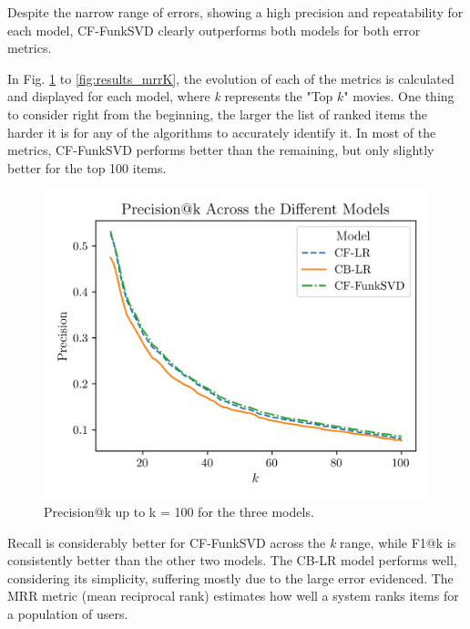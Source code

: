 \documentclass[conference]{IEEEtran}
\begin{document}
Despite the narrow range of errors, showing a high precision and repeatability for each model, CF-FunkSVD clearly outperforms both models for both error metrics.

In Fig. \ref{fig:results_precisionK} to \ref{fig:results_mrrK}, the evolution of each of the metrics is calculated and displayed for each model, where \textit{k} represents the "Top $k$" movies. One thing to consider right from the beginning, the larger the list of ranked items the harder it is for any of the algorithms to accurately identify it. In most of the metrics, CF-FunkSVD performs better than the remaining, but only slightly better for the top 100 items.


\begin{figure}[H]
    \centering
    \includegraphics[width=1\linewidth]{assets/results_precisionK.png}
    \caption{Precision@k up to k = 100 for the three models.}
    \label{fig:results_precisionK}
\end{figure}

Recall is considerably better for CF-FunkSVD across the \textit{k} range, while F1@k is consistently better than the other two models. The CB-LR model performs well, considering its simplicity, suffering mostly due to the large error evidenced. The MRR metric (mean reciprocal rank) estimates how well a system ranks items for a population of users.
\end{document}
